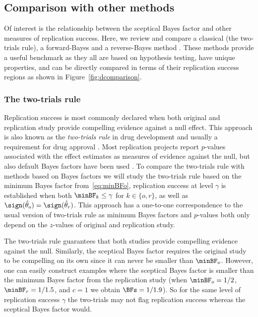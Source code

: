 \subsection{Comparison with other methods}
Of interest is the relationship between the sceptical Bayes factor and other
measures of replication success. Here, we review and compare a classical (the
two-trials rule), a forward-Bayes \citep[the replication Bayes factor
from][]{Verhagen2014} and a reverse-Bayes method \citep[the sceptical $p$-value
from][]{Held2020}. These methods provide a useful benchmark as they all are
based on hypothesis testing, have unique properties, and can be directly
compared in terms of their replication success regions as shown in
Figure~\ref{fig:dcomparison}.


\subsubsection{The two-trials rule}
Replication success is most commonly declared when both original and replication
study provide compelling evidence against a null effect. This approach is also
known as the \emph{two-trials rule} in drug development and usually a
requirement for drug approval \citep[Section 9.4]{Kay2015}. Most replication
projects report $p$-values associated with the effect estimates as measures of
evidence against the null, but also default Bayes factors have been used
\citep[see \eg the Bayesian supplement of][]{Camerer2018}. To compare the
two-trials rule with methods based on Bayes factors we will study the two-trials
rule based on the minimum Bayes factor from~\eqref{eq:minBFo}, \ie replication
success at level $\gamma$ is established when both
$\minBF_{k} %
\leq \gamma$ for $k \in \{o, r\}$, as well as
$\sign(\hat{\theta}_o) = \sign(\hat{\theta}_r)$. This approach has a one-to-one
correspondence to the usual version of two-trials rule as minimum Bayes factors
and $p$-values both only depend on the $z$-values of original and replication
study.



The two-trials rule guarantees that both studies provide compelling evidence
against the null. Similarly, the sceptical Bayes factor requires the original
study to be compelling on its own since it can never be smaller than
$\minBF_{o}$. However, one can easily construct examples where the sceptical
Bayes factor is smaller than the minimum Bayes factor from the replication study
(\eg when $\minBF_{o} = 1/2$,
$\minBF_{r} = 1/1.5$, and $c = 1$
we obtain $\BFs = 1/1.9$). So for the same level of
replication success $\gamma$ the two-trials may not flag replication success
whereas the sceptical Bayes factor would.

